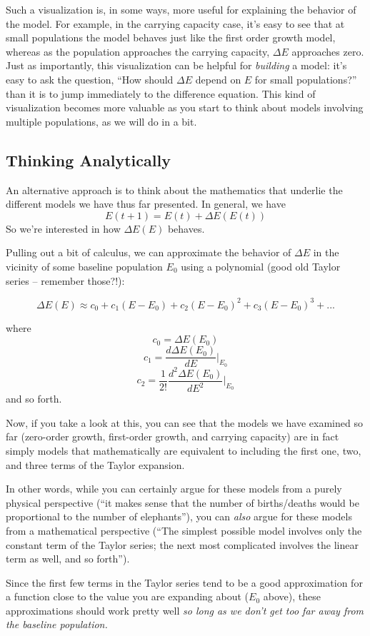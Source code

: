 \documentclass{tufte-handout}
\begin{document}
Such a visualization is, in some ways, more useful for explaining the behavior of the model.  For example, in the carrying capacity case, it's easy to see that at small populations the model behaves just like the first order growth model, whereas as the population approaches the carrying capacity, $\Delta E$ approaches zero.  Just as importantly, this visualization can be helpful for {\it building} a model:  it's easy to ask the question, ``How should $\Delta E$ depend on $E$ for small populations?'' than it is to jump immediately to the difference equation.  This kind of visualization becomes more valuable as you start to think about models involving multiple populations, as we will do in a bit.

\subsection{Thinking Analytically}
An alternative approach is to think about the mathematics that underlie the different models we have thus far presented.  In general, we have
$$E(t+1) = E(t) + \Delta E(E(t))$$
So we're interested in how $\Delta E(E)$ behaves.

Pulling out a bit of calculus, we can approximate the behavior of $\Delta E$ in the vicinity of some baseline population $E_0$ using a polynomial (good old Taylor series -- remember those?!):

$$\Delta E(E) \approx c_0 + c_1(E-E_0) + c_2 (E-E_0)^2 + c_3 (E-E_0)^3 + ...$$

where $$c_0 = \Delta E(E_0)$$
 $$c_1 = \frac{d \Delta E(E_0)}{dE} |_{E_0}$$
$$c_2 = \frac{1}{2!}\frac{d^2 \Delta E(E_0)}{dE^2} |_{E_0}$$
 and so forth.

Now, if you take a look at this, you can see that the models we have examined so far (zero-order growth, first-order growth,  and carrying capacity) are in fact simply models that mathematically are equivalent to including the first one, two, and three terms of the Taylor expansion.

In other words, while you can certainly argue for these models from a purely physical perspective (``it makes sense that the number of births/deaths would be proportional to the number of elephants''), you can {\it also} argue for these models from a mathematical perspective (``The simplest possible model involves only the constant term of the Taylor series; the next most complicated involves the linear term as well, and so forth'').  

Since the first few terms in the Taylor series tend to be a good approximation for a function close to the value you are expanding about ($E_0$ above), these approximations should work pretty well {\it so long as we don't get too far away from the baseline population.}  
\end{document}
